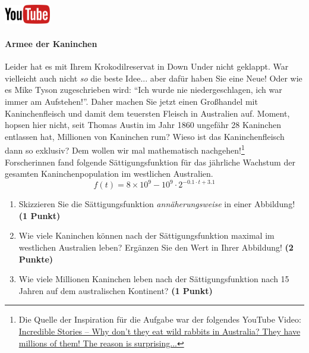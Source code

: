 \documentclass[a4paper, 9pt]{scrartcl}\usepackage[]{graphicx}\usepackage[]{xcolor}
\begin{document}
\hfill\href{https://youtu.be/Mr6eslls4J0}{\includegraphics[width =
  2cm]{img/youtube}} %
\hspace{2Ex}

\paragraph{Armee der Kaninchen}



Leider hat es mit Ihrem Krokodilreservat in Down Under nicht geklappt. War vielleicht
auch nicht \textit{so} die beste Idee... aber daf{\"u}r haben Sie eine Neue!
Oder wie es Mike Tyson zugeschrieben wird: "`Ich wurde nie
niedergeschlagen, ich war immer am Aufstehen!"'. Daher machen Sie jetzt
einen Gro{\ss}handel mit Kaninchenfleisch und damit dem teuersten Fleisch in
Australien auf. Moment, hopsen hier nicht, seit Thomas Austin im Jahr
1860 ungef{\"a}hr 28 Kaninchen entlassen hat,
Millionen von Kaninchen rum? Wieso ist das Kaninchenfleisch dann so
exklusiv? Dem wollen wir mal mathematisch nachgehen!\footnote{Die Quelle
  der Inspiration f{\"u}r die Aufgabe war der folgendes YouTube Video:
  \href{https://youtu.be/38fuOr3tdgc?si=Li7NL_FoByML8JtT}{ Incredible
    Stories -- Why don't they eat wild rabbits in Australia? They have
    millions of them! The reason is surprising...}}
\\

Forscherinnen fand folgende S{\"a}ttigungsfunktion f{\"u}r das j{\"a}hrliche Wachstum
der gesamten Kaninchenpopulation im westlichen Australien.
\begin{equation*}
  f(t) = \ensuremath{8\times 10^{9}} - \ensuremath{10^{9}} \cdot 2^{-0.1 \cdot t + 3.1}
\end{equation*}

\begin{enumerate}
\item Skizzieren Sie die S{\"a}ttigungsfunktion \textit{ann{\"a}herungsweise} in einer Abbildung! \textbf{(1
    Punkt)}
\item Wie viele Kaninchen k{\"o}nnen nach der S{\"a}ttigungsfunktion maximal im
  westlichen Australien leben? Erg{\"a}nzen Sie den Wert in Ihrer Abbildung! \textbf{(2 Punkte)}
\item Wie viele Millionen Kaninchen leben nach der S{\"a}ttigungsfunktion
  nach 15 Jahren auf dem australischen Kontinent? \textbf{(1
    Punkt)}
\end{enumerate}
\end{document}
